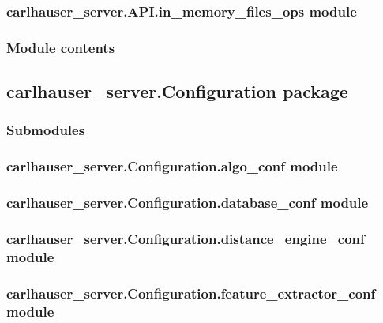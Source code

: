 \documentclass[letterpaper,10pt,english]{sphinxmanual}
\begin{document}
\subsubsection{carlhauser\_server.API.in\_memory\_files\_ops module}
\label{\detokenize{carlhauser_server.API:carlhauser-server-api-in-memory-files-ops-module}}

\subsubsection{Module contents}
\label{\detokenize{carlhauser_server.API:module-contents}}

\subsection{carlhauser\_server.Configuration package}
\label{\detokenize{carlhauser_server.Configuration:carlhauser-server-configuration-package}}\label{\detokenize{carlhauser_server.Configuration::doc}}

\subsubsection{Submodules}
\label{\detokenize{carlhauser_server.Configuration:submodules}}

\subsubsection{carlhauser\_server.Configuration.algo\_conf module}
\label{\detokenize{carlhauser_server.Configuration:carlhauser-server-configuration-algo-conf-module}}

\subsubsection{carlhauser\_server.Configuration.database\_conf module}
\label{\detokenize{carlhauser_server.Configuration:carlhauser-server-configuration-database-conf-module}}

\subsubsection{carlhauser\_server.Configuration.distance\_engine\_conf module}
\label{\detokenize{carlhauser_server.Configuration:carlhauser-server-configuration-distance-engine-conf-module}}

\subsubsection{carlhauser\_server.Configuration.feature\_extractor\_conf module}
\label{\detokenize{carlhauser_server.Configuration:carlhauser-server-configuration-feature-extractor-conf-module}}
\end{document}
